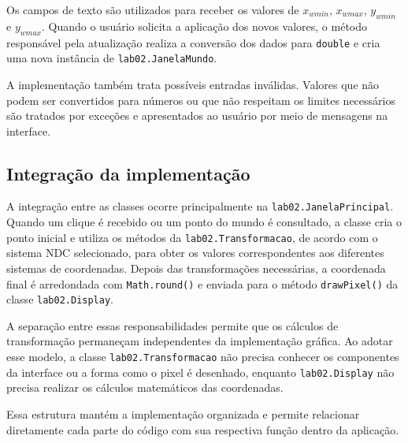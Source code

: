 Os campos de texto são utilizados para receber os valores de $x_{wmin}$, $x_{wmax}$, $y_{wmin}$ e $y_{wmax}$. Quando o usuário solicita a aplicação dos novos valores, o método responsável pela atualização realiza a conversão dos dados para \texttt{double} e cria uma nova instância de \texttt{lab02.JanelaMundo}.

A implementação também trata possíveis entradas inválidas. Valores que não podem ser convertidos para números ou que não respeitam os limites necessários são tratados por exceções e apresentados ao usuário por meio de mensagens na interface.

\subsection{Integração da implementação}
A integração entre as classes ocorre principalmente na \texttt{lab02.JanelaPrincipal}. Quando um clique é recebido ou um ponto do mundo é consultado, a classe cria o ponto inicial e utiliza os métodos da \texttt{lab02.Transformacao}, de acordo com o sistema NDC selecionado, para obter os valores correspondentes aos diferentes sistemas de coordenadas. Depois das transformações necessárias, a coordenada final é arredondada com \texttt{Math.round()} e enviada para o método \texttt{drawPixel()} da classe \texttt{lab02.Display}.

A separação entre essas responsabilidades permite que os cálculos de transformação permaneçam independentes da implementação gráfica. Ao adotar esse modelo, a classe \texttt{lab02.Transformacao} não precisa conhecer os componentes da interface ou a forma como o pixel é desenhado, enquanto \texttt{lab02.Display} não precisa realizar os cálculos matemáticos das coordenadas.

Essa estrutura mantém a implementação organizada e permite relacionar diretamente cada parte do código com sua respectiva função dentro da aplicação.

